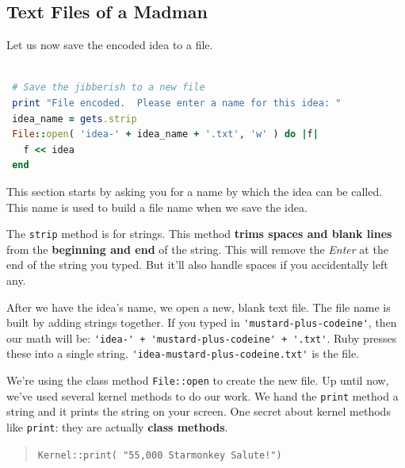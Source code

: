 \documentclass[10pt,twoside]{report}
\begin{document}
\newpage



\subsection{Text Files of a Madman}



Let us now save the encoded idea to a file.


\begin{lstlisting}[basicstyle=\ttfamily\color{basiccolor},
    commentstyle = \ttfamily\color{commentcolor},
    keywordstyle=\ttfamily\color{keywordscolor},
    stringstyle=\color{stringcolor},
    language=Ruby,
    basicstyle=\small\ttfamily,
    showstringspaces=false,
  ]

 # Save the jibberish to a new file
 print "File encoded.  Please enter a name for this idea: "
 idea_name = gets.strip
 File::open( 'idea-' + idea_name + '.txt', 'w' ) do |f|
   f << idea
 end

\end{lstlisting}

This section starts by asking you for a name by which the idea can be
called.  This name is used to build a file name when we save the idea.

The \lstinline[breaklines=true]|strip| method is for strings.  This
method {\bf trims spaces and blank lines} from the {\bf beginning and
  end} of the string.  This will remove the {\em Enter} at the end of
the string you typed. But it'll also handle spaces if you accidentally
left any.

After we have the idea's name, we open a new, blank text file.  The
file name is built by adding strings together.  If you typed in
\lstinline[breaklines=true]|'mustard-plus-codeine'|, then our math
will be: \lstinline[breaklines=true]|'idea-' + 'mustard-plus-codeine' + '.txt'|.  
Ruby presses these into a single string. 
\lstinline[breaklines=true]|'idea-mustard-plus-codeine.txt'|
is the file.

We're using the class method \lstinline[breaklines=true]|File::open|
to create the new file.  Up until now, we've used several kernel
methods to do our work.  We hand the
\lstinline[breaklines=true]|print| method a string and it prints the
string on your screen.  One secret about kernel methods like
\lstinline[breaklines=true]|print|: they are actually {\bf class
  methods}.

\begin{quote}
\lstinline[breaklines=true]|Kernel::print( "55,000 Starmonkey Salute!")|\end{quote}
\end{document}
